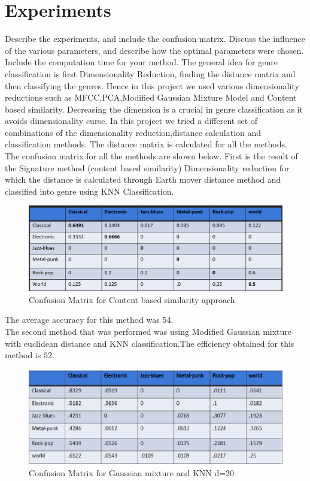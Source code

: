 \documentclass[12pt]{article}
\begin{document}
\section{Experiments}\label{sec:exp}
Describe the experiments, and include the confusion matrix. Discuss
the influence of the various parameters, and describe how the optimal
parameters were chosen. Include the computation time for your method.
The general idea for genre classification is first Dimensionality Reduction, finding the distance matrix and then classifying the genres.
Hence in this project we used various dimensionality reductions such as MFCC,PCA,Modified Gaussian Mixture Model and Content based similarity. Decreasing the dimension is a crucial in genre classification as it avoids dimensionality curse.
In this project we tried a different set of combinations of the dimensionality reduction,distance calculation and classification methods.
The distance matrix is calculated for all the methods.\\
The confusion matrix for all the methods are shown below. First is the result of the Signature method (content based similarity) Dimensionality reduction for which the distance is calculated through Earth mover distance method and classified into genre using KNN Classification.
\begin{figure}[H]
\center
\includegraphics [scale=0.35]{results1.png}
\caption{Confusion Matrix for Content based similarity approach}
\end{figure}
The average accuracy for this method was 54. \\
The second method that was performed was using Modified Gaussian mixture with euclidean distance and KNN classification.The efficiency obtained for this method is $52$.
\begin{figure}[H]
\center
\includegraphics [scale=0.65]{result2.png}
\caption{Confusion Matrix for Gaussian mixture and KNN d=20 }
\end{figure}
\end{document}
